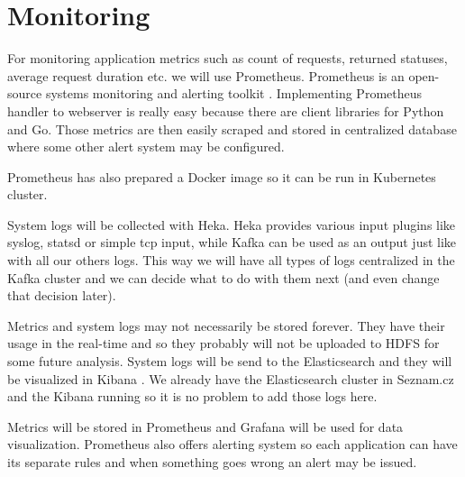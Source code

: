 \chapter{Monitoring}

For monitoring application metrics such as count of requests, returned statuses, average request duration etc. we will use Prometheus. Prometheus is an open-source systems monitoring and alerting toolkit \cite{prometheus}. Implementing Prometheus handler to webserver is really easy because there are client libraries for Python and Go. Those metrics are then easily scraped and stored in centralized database where some other alert system may be configured.

Prometheus has also prepared a Docker image so it can be run in Kubernetes cluster.
 
System logs will be collected with Heka. Heka provides various input plugins like syslog, statsd or simple tcp input, while Kafka can be used as an output just like with all our others logs. This way we will have all types of logs centralized in the Kafka cluster and we can decide what to do with them next (and even change that decision later).
 
Metrics and system logs may not necessarily be stored forever. They have their usage in the real-time and so they probably will not be uploaded to HDFS for some future analysis. System logs will be send to the Elasticsearch and they will be visualized in Kibana \cite{kibana}. We already have the Elasticsearch cluster in Seznam.cz and the Kibana running so it is no problem to add those logs here.

Metrics will be stored in Prometheus and Grafana \cite{grafana} will be used for data visualization. Prometheus also offers alerting system so each application can have its separate rules and when something goes wrong an alert may be issued.
